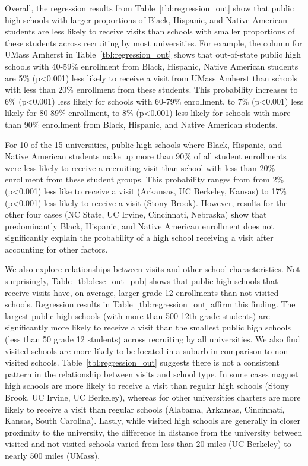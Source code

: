 \documentclass[twoside]{article}
\begin{document}
Overall, the regression results from Table~\ref{tbl:regression_out} show that public high schools with larger proportions of Black, Hispanic, and Native American students are less likely to receive visits than schools with smaller proportions of these students across recruiting by most universities. For example, the column for UMass Amherst in Table~\ref{tbl:regression_out} shows that out-of-state public high schools with 40-59\% enrollment from Black, Hispanic, Native American students are 5\% (p<0.001) less likely to receive a visit from UMass Amherst than schools with less than 20\% enrollment from these students. This probability increases to 6\% (p<0.001) less likely for schools with 60-79\% enrollment, to 7\% (p<0.001) less likely for 80-89\% enrollment, to 8\% (p<0.001) less likely for schools with more than 90\% enrollment from Black, Hispanic, and Native American students.

For 10 of the 15 universities, public high schools where Black, Hispanic, and Native American students make up more than 90\% of all student enrollments were less likely to receive a recruiting visit than school with less than 20\% enrollment from these student groups. This probability ranges from from 2\% (p<0.001) less like to receive a visit (Arkansas, UC Berkeley, Kansas)  to 17\% (p<0.001) less likely to receive a visit (Stony Brook). However, results for the other four cases (NC State, UC Irvine, Cincinnati, Nebraska) show that predominantly Black, Hispanic, and Native American enrollment does not significantly explain the probability of a high school receiving a visit after accounting for other factors.

We also explore relationships between visits and other school characteristics. Not surprisingly, Table~\ref{tbl:desc_out_pub} shows that public high schools that receive visits have, on average, larger grade 12 enrollments than not visited schools. Regression results in Table~\ref{tbl:regression_out} affirm this finding. The largest public high schools (with more than 500 12th grade students) are significantly more likely to receive a visit than the smallest public high schools (less than 50 grade 12 students) across recruiting by all universities.  We also find visited schools are more likely to be located in a suburb in comparison to non visited schools. Table~\ref{tbl:regression_out} suggests there is not a consistent pattern in the relationship between visits and school type. In some cases magnet high schools are more likely to receive a visit than regular high schools (Stony Brook, UC Irvine, UC Berkeley), whereas for other universities charters are more likely to receive a visit than regular schools (Alabama, Arkansas, Cincinnati, Kansas, South Carolina). Lastly, while visited high schools are generally in closer proximity to the university, the difference in distance from the university between visited and not visited schools varied from less than 20 miles (UC Berkeley) to nearly 500 miles (UMass).
\end{document}

